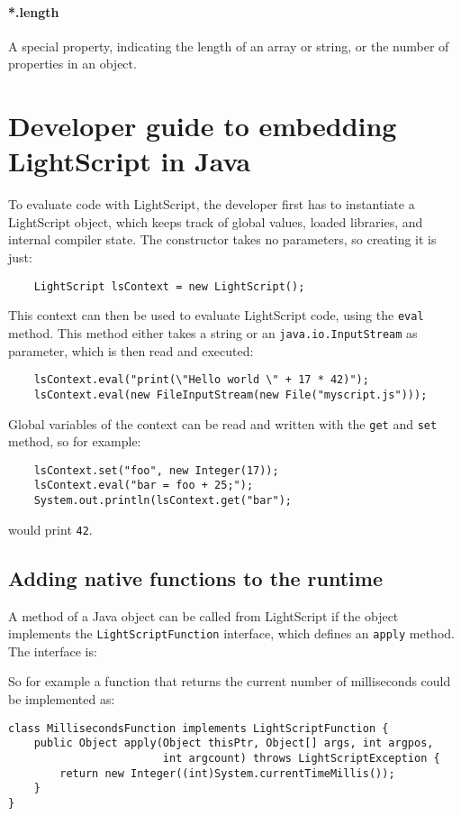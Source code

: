 \documentclass[11pt]{report}
\begin{document}
\paragraph{*.length} A special property, indicating the length of an array or string, or the number of properties in an object.





\section{Developer guide to embedding LightScript in Java}
To evaluate code with LightScript, the developer first has to instantiate a LightScript object, which keeps track of global values, loaded libraries, and internal compiler state. The constructor takes no parameters, so creating it is just:
\begin{lstlisting}
    LightScript lsContext = new LightScript();
\end{lstlisting}
This context can then be used to evaluate LightScript code, using the \verb|eval| method. This method either takes a string or an \verb|java.io.InputStream| as parameter, which is then read and executed:
\begin{lstlisting}
    lsContext.eval("print(\"Hello world \" + 17 * 42)");
    lsContext.eval(new FileInputStream(new File("myscript.js")));
\end{lstlisting}
Global variables of the context can be read and written with the \verb|get| and \verb|set| method, so for example:
\begin{lstlisting}
    lsContext.set("foo", new Integer(17));
    lsContext.eval("bar = foo + 25;");
    System.out.println(lsContext.get("bar");
\end{lstlisting}
would print \verb|42|.

\subsection{Adding native functions to the runtime}

A method of a Java object can be called from LightScript if the object implements the \verb|LightScriptFunction| interface, which defines an \verb|apply| method.
The interface is:

So for example a function that returns the current number of milliseconds could be implemented as:
\begin{lstlisting}
class MillisecondsFunction implements LightScriptFunction {
    public Object apply(Object thisPtr, Object[] args, int argpos, 
                        int argcount) throws LightScriptException {
        return new Integer((int)System.currentTimeMillis());
    }
}
\end{lstlisting}
\end{document}
